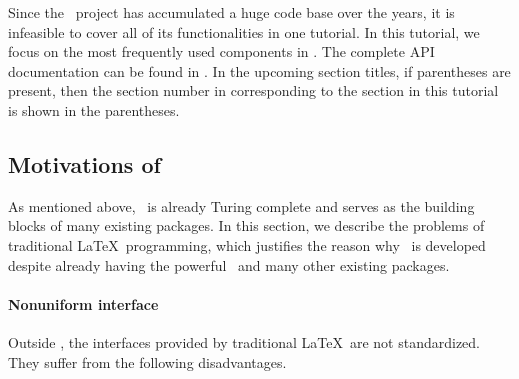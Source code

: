 \documentclass{ltugboat}
\begin{document}


Since the \liii~project has accumulated a huge code base over the years, it is infeasible to cover all of its functionalities in one tutorial.
In this tutorial, we focus on the most frequently used components in \liii. 
The complete API documentation can be found in \cite{l3interface}. 
In the upcoming section titles, if parentheses are present, then the section number in \cite{l3interface} corresponding to the section in this tutorial is shown in the parentheses.

\subsection{Motivations of \liii}

As mentioned above, \LaTeXe~is already Turing complete and serves as the building blocks of many existing packages. In this section, we describe the problems of traditional \LaTeX~programming, which justifies the reason why \liii~is developed despite already having the powerful \LaTeXe~and many other existing packages.

\paragraph{Nonuniform interface} 

Outside \liii, the interfaces provided by traditional \LaTeX~are not standardized. They suffer from the following disadvantages.

\end{document}
